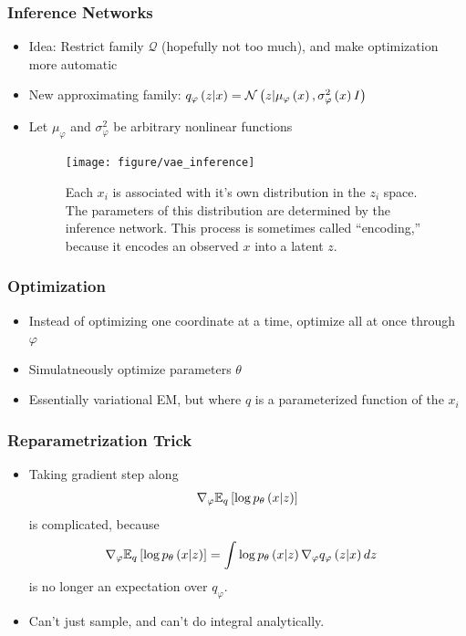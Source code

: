 \documentclass[10pt,mathserif]{beamer}
\begin{document}
\begin{frame}
  \frametitle{Inference Networks}
  \begin{itemize}
  \item Idea: Restrict family $\mathcal{Q}$ (hopefully not too much), and make
    optimization more automatic
  \item New approximating family: $q_{\varphi}\left(z \vert x\right) = \mathcal{N}\left(z \vert
    \mu_{\varphi}\left(x\right), \sigma^{2}_{\varphi}\left(x\right) I\right)$
  \item Let $\mu_{\varphi}$ and $\sigma^{2}_{\varphi}$ be arbitrary nonlinear
    functions
    \begin{figure}
        \centering
        \texttt{[image: figure/vae\_inference]}
        \caption{Each $x_i$ is associated with it's own distribution in the
          $z_i$ space. The parameters of this distribution are determined by the
          inference network. This process is sometimes called ``encoding,''
          because it encodes an observed $x$ into a latent
          $z$. \label{fig:vae_inference} }
    \end{figure}
  \end{itemize}
\end{frame}

\begin{frame}
  \frametitle{Optimization}
\begin{itemize}
\item Instead of optimizing one coordinate at a time, optimize all at once
  through $\varphi$
\item Simulatneously optimize parameters $\theta$
\item Essentially variational EM, but where $q$ is a parameterized function of
  the $x_{i}$
\end{itemize}
\end{frame}

\begin{frame}
  \frametitle{Reparametrization Trick}
  \begin{itemize}
  \item Taking gradient step along
  \begin{align*}
    \nabla_{\varphi} \mathbb{E}_{q}\left[{\log p_{\theta}\left(x \vert z\right)}\right]
  \end{align*}
  is complicated, because
  \begin{align*}
    \nabla_{\varphi} \mathbb{E}_{q}\left[{\log p_{\theta}\left(x \vert z\right)}\right] &= \int \log p_{\theta}\left(x \vert z\right)
    \nabla_{\varphi}q_{\varphi}\left(z \vert x\right)dz
  \end{align*}
  is no longer an expectation over $q_{\varphi}$.
  \item Can't just sample, and can't do integral analytically.
  \end{itemize}
\end{frame}
\end{document}
